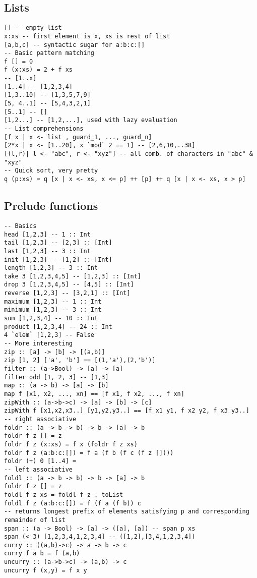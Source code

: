 \documentclass{article}
\begin{document}
\subsection{Lists}
\begin{verbatim}
[] -- empty list
x:xs -- first element is x, xs is rest of list
[a,b,c] -- syntactic sugar for a:b:c:[]
-- Basic pattern matching
f [] = 0
f (x:xs) = 2 + f xs
-- [1..x]
[1..4] -- [1,2,3,4]
[1,3..10] -- [1,3,5,7,9]
[5, 4..1] -- [5,4,3,2,1] 
[5..1] -- []
[1,2...] -- [1,2,...], used with lazy evaluation
-- List comprehensions
[f x | x <- list , guard_1, ..., guard_n]
[2*x | x <- [1..20], x `mod` 2 == 1] -- [2,6,10,..38]
[(l,r)| l <- "abc", r <- "xyz"] -- all comb. of characters in "abc" & "xyz"
-- Quick sort, very pretty
q (p:xs) = q [x | x <- xs, x <= p] ++ [p] ++ q [x | x <- xs, x > p]
\end{verbatim}

\subsection{Prelude functions}
\begin{verbatim}
-- Basics
head [1,2,3] -- 1 :: Int
tail [1,2,3] -- [2,3] :: [Int]
last [1,2,3] -- 3 :: Int
init [1,2,3] -- [1,2] :: [Int]
length [1,2,3] -- 3 :: Int
take 3 [1,2,3,4,5] -- [1,2,3] :: [Int]
drop 3 [1,2,3,4,5] -- [4,5] :: [Int]
reverse [1,2,3] -- [3,2,1] :: [Int]
maximum [1,2,3] -- 1 :: Int
minimum [1,2,3] -- 3 :: Int
sum [1,2,3,4] -- 10 :: Int
product [1,2,3,4] -- 24 :: Int
4 `elem` [1,2,3] -- False
-- More interesting
zip :: [a] -> [b] -> [(a,b)]
zip [1, 2] ['a', 'b'] == [(1,'a'),(2,'b')]
filter :: (a->Bool) -> [a] -> [a]
filter odd [1, 2, 3] -- [1,3]
map :: (a -> b) -> [a] -> [b]
map f [x1, x2, ..., xn] == [f x1, f x2, ..., f xn]
zipWith :: (a->b->c) -> [a] -> [b] -> [c]
zipWith f [x1,x2,x3..] [y1,y2,y3..] == [f x1 y1, f x2 y2, f x3 y3..]
-- right associative
foldr :: (a -> b -> b) -> b -> [a] -> b
foldr f z [] = z
foldr f z (x:xs) = f x (foldr f z xs)
foldr f z (a:b:c:[]) = f a (f b (f c (f z [])))
foldr (+) 0 [1..4] = 
-- left associative
foldl :: (a -> b -> b) -> b -> [a] -> b
foldr f z [] = z
foldl f z xs = foldl f z . toList
foldl f z (a:b:c:[]) = f (f a (f b)) c
-- returns longest prefix of elements satisfying p and corresponding remainder of list
span :: (a -> Bool) -> [a] -> ([a], [a]) -- span p xs
span (< 3) [1,2,3,4,1,2,3,4] -- ([1,2],[3,4,1,2,3,4])
curry :: ((a,b)->c) -> a -> b -> c
curry f a b = f (a,b)
uncurry :: (a->b->c) -> (a,b) -> c
uncurry f (x,y) = f x y
\end{verbatim}
\end{document}
